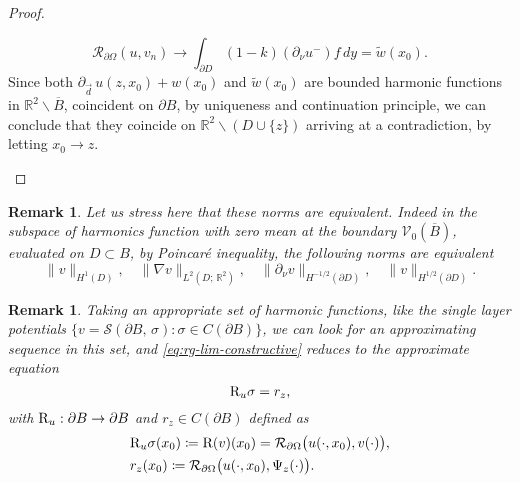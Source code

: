 \documentclass[10pt, a4paper, twoside, openright]{book}
\theoremstyle{definition}
\theoremstyle{plain}
\theoremstyle{plain}
\theoremstyle{plain}
\theoremstyle{plain}
\newtheorem{remark}[subsection]{Remark}
\theoremstyle{plain}
\theoremstyle{plain}
\theoremstyle{plain}
\theoremstyle{plain}
\begin{document}
\begin{proof}
\begin{enumerate}
  \begin{equation}
   \mathcal{R}_{\partial \Omega}(u,v_n) \to \int_{\partial D}(1-k)(\partial_\nu u^- )f\,dy = \widetilde{w}(x_0).
  \end{equation}
 Since both $\partial_{\vec{d}}\,u(z,x_0) + w(x_0)$ and $\widetilde{w}(x_0)$ are bounded harmonic functions
 in $\mathbb{R}^2\backslash\overline{B}$, coincident on $\partial B$, by uniqueness
 and continuation principle, we can conclude that they coincide on $\mathbb{R}^2\backslash (D\cup\{z\})$ arriving at a contradiction, by letting $x_0\to z$.
 \end{enumerate}
\end{proof}
\begin{remark}
 Let us stress here that these norms are equivalent. Indeed in the subspace of harmonics function with zero mean at the boundary $\mathcal{V}_0(\overline{B})$, evaluated on $D\subset B$, by Poincaré inequality, the following norms are equivalent
 \begin{equation}
  \|v\|_{H^1(D)},\quad\|\nabla v\|_{L^2(D;\,\mathbb{R}^2)},\quad \|\partial_\nu v\|_{H^{-1/2}(\partial D)},\quad \|v\|_{H^{1/2}(\partial D)}.
 \end{equation}
\end{remark}
\begin{remark}
 Taking an appropriate set of harmonic functions, like the single layer potentials $\{v=\mathcal{S}(\partial B,\,\sigma): \sigma \in C(\partial B)\}$, we can look for an approximating sequence in this set, 
 and \eqref{eq:rg-lim-constructive} reduces to the approximate equation
 \begin{equation}
  \textup{R}_u \sigma = r_z,\label{eq:rg-approximate-eq}
 \end{equation}
with $\textup{R}_u:\partial B\to \partial B$ and $r_z\in C(\partial B)$ defined as
\begin{align}
 &\textup{R}_u\sigma(x_0) \coloneqq  \textup{R}(v)(x_0)=\mathcal{R}_{\partial\Omega}\bigl(u(\cdot,x_0),v(\cdot)\bigr), \\
 & r_z(x_0)\coloneqq \mathcal{R}_{\partial\Omega}\bigl(u(\cdot,x_0),\Psi_z(\cdot)\bigr).
\end{align}
\end{remark}
\end{document}
